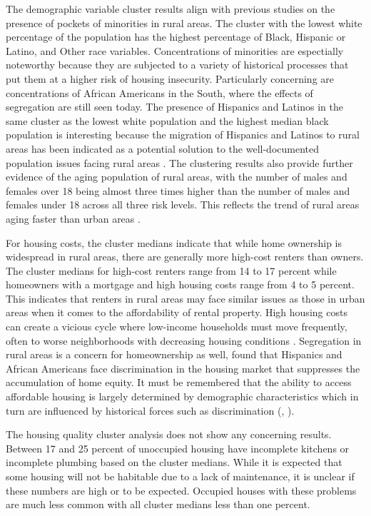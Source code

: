  The demographic variable cluster results align with previous studies on the presence of pockets of minorities in rural areas. The cluster with the lowest white percentage of the population has the highest percentage of Black, Hispanic or Latino, and Other race variables. Concentrations of minorities are espectially noteworthy because they are subjected to a variety of historical processes that put them at a higher risk of housing insecurity. Particularly concerning are concentrations of African Americans in the South, where the effects of segregation are still seen today. The presence of Hispanics and Latinos in the same cluster as the lowest white population and the highest median black population is interesting because the migration of Hispanics and Latinos to rural areas has been indicated as a potential solution to the well-documented population issues facing rural areas \citep{lichter_demographic_2020}. The clustering results also provide further evidence of the aging population of rural areas, with the number of males and females over 18 being almost three times higher than the number of males and females under 18 across all three risk levels. This reflects the trend of rural areas aging faster than urban areas \citep{cohen_aging_2022}. 
 
For housing costs, the cluster medians indicate that while home ownership is widespread in rural areas, there are generally more high-cost renters than owners. The cluster medians for high-cost renters range from 14 to 17 percent while homeowners with a mortgage and high housing costs range from 4 to 5 percent. This indicates that renters in rural areas may face similar issues as those in urban areas when it comes to the affordability of rental property. High housing costs can create a vicious cycle where low-income households must move frequently, often to worse neighborhoods with decreasing housing conditions \citep{desmond_forced_2015}. Segregation in rural areas is a concern for homeownership as well, \citet{krivo_housing_2004} found that Hispanics and African Americans face discrimination in the housing market that suppresses the accumulation of home equity. It must be remembered that the ability to access affordable housing is largely determined by demographic characteristics which in turn are influenced by historical forces such as discrimination (\citealp{yadavalli_comprehensive_2020}, \citealp{hernandez_housing_2019}). 

The housing quality cluster analysis does not show any concerning results. Between 17 and 25 percent of unoccupied housing have incomplete kitchens or incomplete plumbing based on the cluster medians. While it is expected that some housing will not be habitable due to a lack of maintenance, it is unclear if these numbers are high or to be expected. Occupied houses with these problems are much less common with all cluster medians less than one percent.  
 
